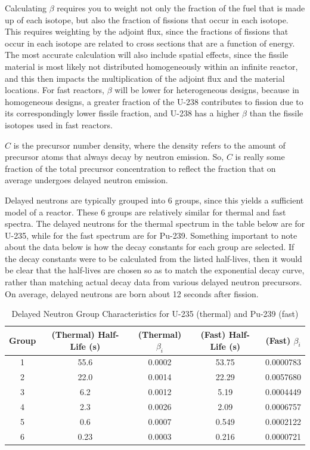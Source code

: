\documentclass[10pt]{article}
\begin{document}
\begin{flushleft}
Calculating \(\beta\) requires you to weight not only the fraction of the fuel that is made up of each isotope, but also the fraction of fissions that occur in each isotope. This requires weighting by the adjoint flux, since the fractions of fissions that occur in each isotope are related to cross sections that are a function of energy. The most accurate calculation will also include spatial effects, since the fissile material is most likely not distributed homogeneously within an infinite reactor, and this then impacts the multiplication of the adjoint flux and the material locations. For fast reactors, \(\beta\) will be lower for heterogeneous designs, because in homogeneous designs, a greater fraction of the U-238 contributes to fission due to its correspondingly lower fissile fraction, and U-238 has a higher \(\beta\) than the fissile isotopes used in fast reactors.

\(C\) is the precursor number density, where the density refers to the amount of precursor atoms that always decay by neutron emission. So, \(C\) is really some fraction of the total precursor concentration to reflect the fraction that on average undergoes delayed neutron emission. 

Delayed neutrons are typically grouped into 6 groups, since this yields a sufficient model of a reactor. These 6 groups are relatively similar for thermal and fast spectra. The delayed neutrons for the thermal spectrum in the table below are for U-235, while for the fast spectrum are for Pu-239. Something important to note about the data below is how the decay constants for each group are selected. If the decay constants were to be calculated from the listed half-lives, then it would be clear that the half-lives are chosen so as to match the exponential decay curve, rather than matching actual decay data from various delayed neutron precursors. On average, delayed neutrons are born about 12 seconds after fission. 

\begin{table}[h]
\caption{Delayed Neutron Group Characteristics for U-235 (thermal) and Pu-239 (fast)} %
\centering %
\begin{tabular}{c |c c |c c} %
\hline\hline %
 Group & (Thermal) Half-Life (s) & (Thermal) \(\beta_i\) & (Fast) Half-Life (s) & (Fast) \(\beta_i\)
\\ [0.5ex]
\hline %
1 & 55.6 & 0.0002 & 53.75 & 0.0000783\\
2 & 22.0 & 0.0014 & 22.29 & 0.0057680\\
3 & 6.2  & 0.0012 &  5.19 & 0.0004449\\
4 & 2.3  & 0.0026 &  2.09 & 0.0006757\\
5 & 0.6  & 0.0007 & 0.549 & 0.0002122\\
6 & 0.23 & 0.0003 & 0.216 & 0.0000721\\
\hline %
\end{tabular}
\label{tab:PPer}
\end{table}


\end{flushleft}
\end{document}
